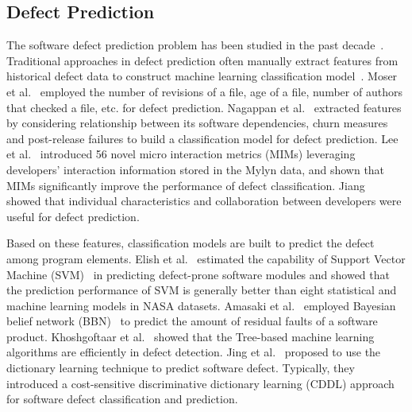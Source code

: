 \subsection{Defect Prediction}
\label{sec:defect}


The software defect prediction problem has been studied in the past decade~\cite{nam2013transfer, menzies2010defect, menzies2007data, zimmermann2007predicting, jiang2013personalized, nagappan2007using, nguyen2011topic, wang2012compressed}. Traditional approaches in defect prediction often manually extract features from historical defect data to construct machine learning classification model~\cite{menzies2010defect}. 
Moser et al.~\cite{moser2008comparative} employed the number of revisions of a file, age of a file, number of authors that checked a file, etc. for defect prediction. Nagappan et al.~\cite{nagappan2007using} extracted features by considering relationship between its software
dependencies, churn measures and post-release failures to build a classification model for defect prediction. Lee et al.~\cite{lee2011micro} introduced 56 novel micro interaction metrics (MIMs) leveraging developers' interaction information stored in the Mylyn data, and shown that MIMs significantly improve the performance of defect classification. Jiang~\cite{jiang2013personalized} showed that individual characteristics and collaboration between developers were useful for defect prediction. 

Based on these features, classification models are built to predict the defect among program elements. Elish et al.~\cite{elish2008predicting} estimated the capability of Support Vector Machine (SVM)~\cite{suykens1999least} in predicting defect-prone software modules and showed that the prediction performance of SVM is generally better than eight statistical and machine learning models in NASA datasets. Amasaki et al.~\cite{amasaki2003bayesian} employed Bayesian belief network (BBN)~\cite{mcabeebayesian} to predict the amount of residual faults of a software product. Khoshgoftaar et al.~\cite{khoshgoftaar2002tree}
showed that the Tree-based machine learning algorithms are efficiently in defect detection. Jing et al.~\cite{jing2014dictionary} proposed to use the dictionary learning technique to predict software defect. Typically, they introduced a cost-sensitive discriminative dictionary learning (CDDL) approach for software defect classification and prediction.

